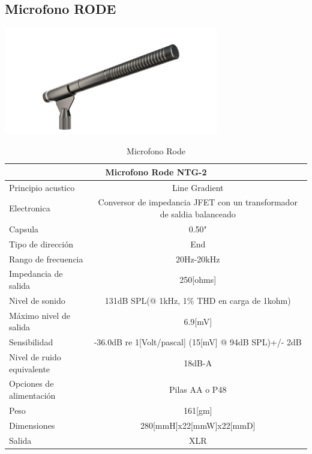 \documentclass[a4paper]{book}
\begin{document}
\subsection{Microfono RODE}

\begin{center}
\includegraphics[width=0.7\textwidth]{Figures/Hardware/Partes/Rode.jpg}
\label{fig:Hardware:Partes:Microfono:Rode}
\end{center}

\begin{table}[H]
\begin{center}
\begin{tabular}{|l|l|}%

\hline
\multicolumn{2}{|c|}{Microfono Rode NTG-2} \\ \hline %
Principio acustico &  \multicolumn{1}{|c|}{Line Gradient}\\ \hline
Electronica & \multicolumn{1}{|c|}{Conversor de impedancia JFET con un transformador de saldia balanceado}\\ \hline
Capsula & \multicolumn{1}{|c|}{0.50"}\\ \hline
Tipo de dirección & \multicolumn{1}{|c|}{End}\\ \hline
Rango de frecuencia & \multicolumn{1}{|c|}{20Hz-20kHz}\\ \hline
Impedancia de salida & \multicolumn{1}{|c|}{250[ohms]}\\ \hline
Nivel de sonido & \multicolumn{1}{|c|}{131dB SPL(@ 1kHz, 1\% THD en carga de 1kohm)}\\ \hline
Máximo nivel de salida & \multicolumn{1}{|c|}{6.9[mV]}\\ \hline
Sensibilidad & \multicolumn{1}{|c|}{-36.0dB re 1[Volt/pascal] (15[mV] @ 94dB SPL)+/- 2dB}\\ \hline
Nivel de ruido equivalente & \multicolumn{1}{|c|}{18dB-A}\\ \hline
Opciones de alimentación & \multicolumn{1}{|c|}{Pilas AA o P48}\\ \hline
Peso & \multicolumn{1}{|c|}{161[gm]}\\ \hline
Dimensiones & \multicolumn{1}{|c|}{280[mmH]x22[mmW]x22[mmD]}\\ \hline
Salida & \multicolumn{1}{|c|}{XLR}\\ \hline


\end{tabular}
\caption{Microfono Rode}
\label{Microfono Rode}
\end{center}
\end{table}
\vfill
\end{document}
